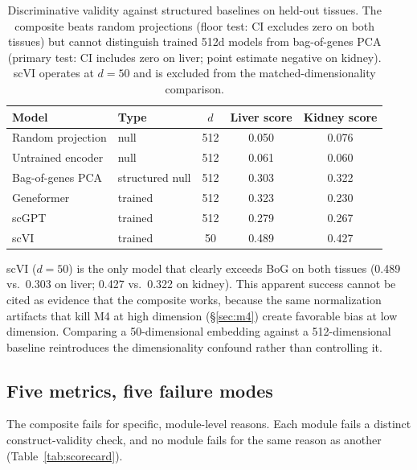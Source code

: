 \documentclass[9pt,lineno]{elife}
\begin{document}
\begin{table}[t]
\centering
\caption{Discriminative validity against structured baselines on held-out tissues. The composite beats random projections (floor test: CI excludes zero on both tissues) but cannot distinguish trained 512d models from bag-of-genes PCA (primary test: CI includes zero on liver; point estimate negative on kidney). scVI operates at $d = 50$ and is excluded from the matched-dimensionality comparison.}
\label{tab:v6b}
\small
\begin{tabular}{@{}llccc@{}}
\toprule
Model & Type & $d$ & Liver score & Kidney score \\
\midrule
Random projection & null & 512 & 0.050 & 0.076 \\
Untrained encoder & null & 512 & 0.061 & 0.060 \\
\midrule
Bag-of-genes PCA & structured null & 512 & 0.303 & 0.322 \\
\midrule
Geneformer & trained & 512 & 0.323 & 0.230 \\
scGPT & trained & 512 & 0.279 & 0.267 \\
scVI & trained & 50 & 0.489 & 0.427 \\
\bottomrule
\end{tabular}
\end{table}

scVI ($d = 50$) is the only model that clearly exceeds BoG on both tissues (0.489 vs.\ 0.303 on liver; 0.427 vs.\ 0.322 on kidney). This apparent success cannot be cited as evidence that the composite works, because the same normalization artifacts that kill M4 at high dimension (\S\ref{sec:m4}) create favorable bias at low dimension. Comparing a 50-dimensional embedding against a 512-dimensional baseline reintroduces the dimensionality confound rather than controlling it.

\subsection{Five metrics, five failure modes}
\label{sec:five_failures}

The composite fails for specific, module-level reasons. Each module fails a distinct construct-validity check, and no module fails for the same reason as another (Table~\ref{tab:scorecard}).
\end{document}
